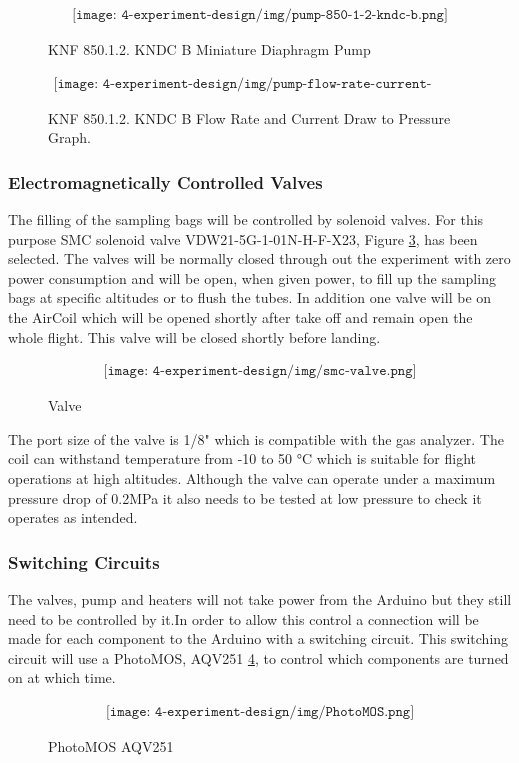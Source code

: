 \begin{figure}[H]
    \begin{align*}
        \texttt{[image: 4-experiment-design/img/pump-850-1-2-kndc-b.png]}
    \end{align*}
    \caption{KNF 850.1.2. KNDC B Miniature Diaphragm Pump}\label{fig:pumppic}
\end{figure}


\begin{figure}[H]
    \begin{align*}
        \texttt{[image: 4-experiment-design/img/pump-flow-rate-current-graph.png]}
    \end{align*}
    \caption{KNF 850.1.2. KNDC B Flow Rate and Current Draw to Pressure Graph.}\label{fig:pumpflowcur}
\end{figure}


\subsubsection{Electromagnetically Controlled Valves}
The filling of the sampling bags will be controlled by solenoid valves. For this purpose SMC solenoid valve VDW21-5G-1-01N-H-F-X23, Figure \ref{fig:valve}, has been selected. The valves will be normally closed through out the experiment with zero power consumption and will be open, when given power, to fill up the sampling bags at specific altitudes or to flush the tubes. In addition one valve will be on the AirCoil which will be opened shortly after take off and remain open the whole flight. This valve will be closed shortly before landing.

\begin{figure}[H]
    \begin{align*}
        \texttt{[image: 4-experiment-design/img/smc-valve.png]}
    \end{align*}
    \caption{Valve}\label{fig:valve}
\end{figure}

The port size of the valve is 1/8" which is compatible with the gas analyzer. The coil can withstand temperature from -10 to 50 °C which is suitable for flight operations at high altitudes. Although the valve can operate under a maximum pressure drop of 0.2MPa it also needs to be tested at low pressure to check it operates as intended. 

\subsubsection{Switching Circuits}
The valves, pump and heaters will not take power from the Arduino but they still need to be controlled by it.In order to allow this control a connection will be made for each component to the Arduino with a switching circuit. This switching circuit will use a PhotoMOS, AQV251 \ref{fig:photoMOS}, to control which components are turned on at which time.

\begin{figure}[H]
    \begin{align*}
        \texttt{[image: 4-experiment-design/img/PhotoMOS.png]}
    \end{align*}
    \caption{PhotoMOS AQV251}\label{fig:photoMOS}
\end{figure}


\raggedbottom